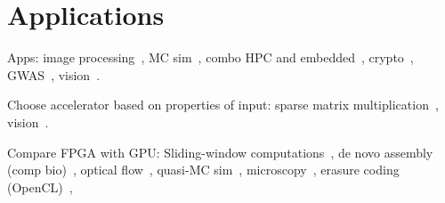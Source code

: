 \section{Applications}
\label{sec:apps}

Apps: image processing~\cite{dbd+13}, MC sim~\cite{shsc08,tttl10},
combo HPC and embedded~\cite{rpm+15}, crypto~\cite{dfg+13},
GWAS~\cite{kws+16},
vision~\cite{brf14}.

Choose accelerator based on properties of input:
sparse matrix multiplication~\cite{gsbh16},
vision~\cite{mfo+16}.

Compare FPGA with GPU: Sliding-window computations~\cite{cfbs15},
de novo assembly (comp bio)~\cite{mjk+16},
optical flow~\cite{bnw+10}, quasi-MC sim~\cite{tb10},
microscopy~\cite{tzwz15}, erasure coding (OpenCL)~\cite{czs+16},
